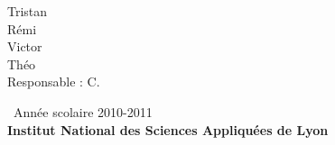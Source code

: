 \documentclass[12pt,twoside,a4paper,leqno,titlepage]{report}
\begin{document}
\begin{center}
\vspace*{1cm}
\LARGE \color{black} Tristan  \\ R\'emi  \\ Victor  \\ Th\'eo  \\
\vspace*{2.5cm}
\Large Responsable : C. \\
\end{center}
\vspace*{1.5cm}
\begin{flushleft}
\Large \, Ann\'ee scolaire 2010-2011\\
\vspace*{0.2cm}
\textbf{\Large Institut National des Sciences Appliqu\'{e}es de Lyon} \pagebreak
\end{flushleft}




\begin{abstract}
R\'esum\'e de notre projet \newline
\begin{center}
J'$\heartsuit$ \LaTeX{}
\end{center}
\end{abstract}

\tableofcontents
\newpage






\tableofcontents
\end{document}
